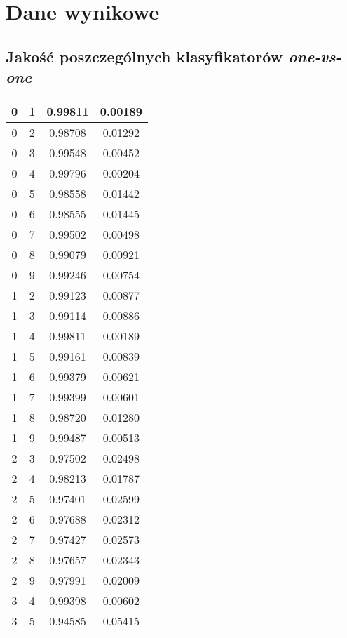 \documentclass[12pt,a4paper,notitlepage]{article}
\begin{document}
\section{Dane wynikowe}

\subsection{Jakość poszczególnych klasyfikatorów \textit{one-vs-one}}
\begin{center}
\begin{tabular}{|c|c|c|c|}
\hline
   0 & 1 &  0.99811 & 0.00189\\\hline
   0 & 2 &  0.98708 & 0.01292\\\hline
   0 & 3 &  0.99548 & 0.00452\\\hline
   0 & 4 &  0.99796 & 0.00204\\\hline
   0 & 5 &  0.98558 & 0.01442\\\hline
   0 & 6 &  0.98555 & 0.01445\\\hline
   0 & 7 &  0.99502 & 0.00498\\\hline
   0 & 8 &  0.99079 & 0.00921\\\hline
   0 & 9 &  0.99246 & 0.00754\\\hline
   1 & 2 &  0.99123 & 0.00877\\\hline
   1 & 3 &  0.99114 & 0.00886\\\hline
   1 & 4 &  0.99811 & 0.00189\\\hline
   1 & 5 &  0.99161 & 0.00839\\\hline
   1 & 6 &  0.99379 & 0.00621\\\hline
   1 & 7 &  0.99399 & 0.00601\\\hline
   1 & 8 &  0.98720 & 0.01280\\\hline
   1 & 9 &  0.99487 & 0.00513\\\hline
   2 & 3 &  0.97502 & 0.02498\\\hline
   2 & 4 &  0.98213 & 0.01787\\\hline
   2 & 5 &  0.97401 & 0.02599\\\hline
   2 & 6 &  0.97688 & 0.02312\\\hline
   2 & 7 &  0.97427 & 0.02573\\\hline
   2 & 8 &  0.97657 & 0.02343\\\hline
   2 & 9 &  0.97991 & 0.02009\\\hline
   3 & 4 &  0.99398 & 0.00602\\\hline
   3 & 5 &  0.94585 & 0.05415\\\hline

\end{tabular}
\end{center}
\end{document}
